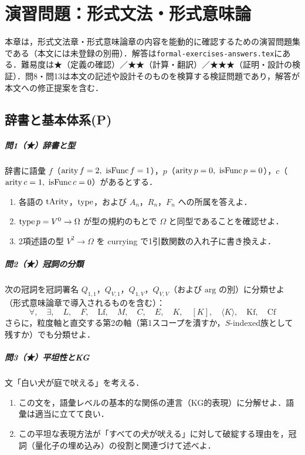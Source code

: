 \documentclass[../../main-detail.tex]{subfiles}
\begin{document}
\chapter{演習問題：形式文法・形式意味論}
本章は，形式文法章・形式意味論章の内容を能動的に確認するための演習問題集である（本文には未登録の別冊）．解答は\texttt{formal-exercises-answers.tex}にある．難易度は★（定義の確認）／★★（計算・翻訳）／★★★（証明・設計の検証）．問8・問13は本文の記述や設計そのものを検算する検証問題であり，解答が本文への修正提案を含む．

\section{辞書と基本体系(P)}

\paragraph{問1（★）辞書と型}
辞書に語彙 $f$（$\mathop{\mathrm{arity}} f = 2,\ \mathop{\mathrm{isFunc}} f = 1$），$p$（$\mathop{\mathrm{arity}} p = 0,\ \mathop{\mathrm{isFunc}} p = 0$），$c$（$\mathop{\mathrm{arity}} c = 1,\ \mathop{\mathrm{isFunc}} c = 0$）があるとする．
\begin{enumerate}[label=(\alph*)]
    \item 各語の $\mathop{\mathrm{tArity}}$，$\mathop{\mathrm{type}}$，および $A_n$，$R_n$，$F_n$ への所属を答えよ．
    \item $\mathop{\mathrm{type}} p = V^0 \to \Omega$ が型の規約のもとで $\Omega$ と同型であることを確認せよ．
    \item 2項述語の型 $V^2 \to \Omega$ を currying で1引数関数の入れ子に書き換えよ．
\end{enumerate}

\paragraph{問2（★）冠詞の分類}
次の冠詞を冠詞署名 $Q_{1,1}$，$Q_{V,1}$，$Q_{1,V}$，$Q_{V,V}$（および $\mathrm{arg}$ の別）に分類せよ（形式意味論章で導入されるものを含む）：
\[
    \forall,\quad \exists,\quad L,\quad F,\quad \mathrm{Lf},\quad M,\quad C,\quad E,\quad K,\quad [K],\quad \langle K\rangle,\quad \mathrm{Kf},\quad \mathrm{Cf}
\]
さらに，粒度軸と直交する第2の軸（第1スコープを潰すか，$S$-indexed族として残すか）でも分類せよ．

\paragraph{問3（★）平坦性とKG}
文「白い犬が庭で吠える」を考える．
\begin{enumerate}[label=(\alph*)]
    \item この文を，語彙レベルの基本的な関係の連言（KG的表現）に分解せよ．語彙は適当に立てて良い．
    \item この平坦な表現方法が「すべての犬が吠える」に対して破綻する理由を，冠詞（量化子の埋め込み）の役割と関連づけて述べよ．
\end{enumerate}
\end{document}
